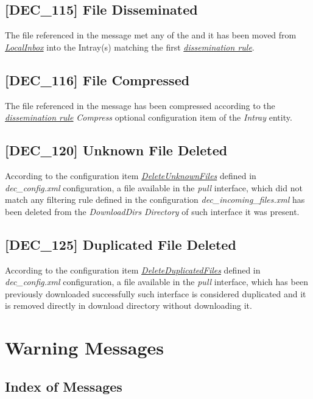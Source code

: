 \documentclass[dec_sum_main.tex]{subfiles}
\begin{document}
\subsection{[DEC\_115] File Disseminated}
The file referenced in the message met any of the and it has been moved from \hyperref[LocalInbox]{\textit{LocalInbox}} into the Intray(s) matching the first \hyperref[Dissemination rules]{\textit{dissemination rule}}.

\subsection{[DEC\_116] File Compressed}
The file referenced in the message has been compressed according to the \hyperref[Dissemination rules]{\textit{dissemination rule}} \textit{Compress} optional configuration item of the \textit{Intray} entity.

\subsection{[DEC\_120] Unknown File Deleted}
According to the configuration item \hyperref[DeleteUnknownFiles]{\textit{DeleteUnknownFiles}} defined in \textit{dec\_config.xml} configuration, a file available in the \textit{pull} interface, which did not match any filtering rule defined in the configuration \textit{dec\_incoming\_files.xml} has been deleted from the \textit{DownloadDirs} \textit{Directory} of such interface it was present.

\subsection{[DEC\_125] Duplicated File Deleted}
According to the configuration item \hyperref[DeleteDuplicatedFiles]{\textit{DeleteDuplicatedFiles}} defined in \textit{dec\_config.xml} configuration, a file available in the \textit{pull} interface, which has been previously downloaded successfully such interface is considered duplicated and it is removed directly in download directory without downloading it.


\section{Warning Messages}

\subsection{Index of Messages}
\end{document}
